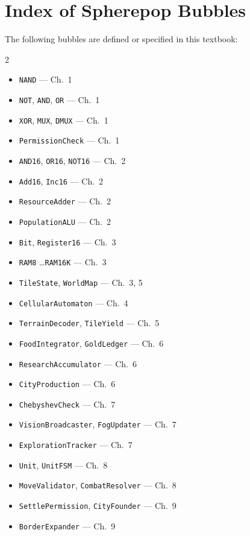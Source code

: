\documentclass[11pt,a4paper,openany]{book}
\theoremstyle{plain}
\theoremstyle{definition}
\theoremstyle{remark}
\begin{document}
\chapter*{Index of Spherepop Bubbles}

The following bubbles are defined or specified in this textbook:

\begin{multicols}{2}
\begin{itemize}[leftmargin=*, itemsep=0pt]
  \item \texttt{NAND} --- Ch.~1
  \item \texttt{NOT}, \texttt{AND}, \texttt{OR} --- Ch.~1
  \item \texttt{XOR}, \texttt{MUX}, \texttt{DMUX} --- Ch.~1
  \item \texttt{PermissionCheck} --- Ch.~1
  \item \texttt{AND16}, \texttt{OR16}, \texttt{NOT16} --- Ch.~2
  \item \texttt{Add16}, \texttt{Inc16} --- Ch.~2
  \item \texttt{ResourceAdder} --- Ch.~2
  \item \texttt{PopulationALU} --- Ch.~2
  \item \texttt{Bit}, \texttt{Register16} --- Ch.~3
  \item \texttt{RAM8} \ldots \texttt{RAM16K} --- Ch.~3
  \item \texttt{TileState}, \texttt{WorldMap} --- Ch.~3, 5
  \item \texttt{CellularAutomaton} --- Ch.~4
  \item \texttt{TerrainDecoder}, \texttt{TileYield} --- Ch.~5
  \item \texttt{FoodIntegrator}, \texttt{GoldLedger} --- Ch.~6
  \item \texttt{ResearchAccumulator} --- Ch.~6
  \item \texttt{CityProduction} --- Ch.~6
  \item \texttt{ChebyshevCheck} --- Ch.~7
  \item \texttt{VisionBroadcaster}, \texttt{FogUpdater} --- Ch.~7
  \item \texttt{ExplorationTracker} --- Ch.~7
  \item \texttt{Unit}, \texttt{UnitFSM} --- Ch.~8
  \item \texttt{MoveValidator}, \texttt{CombatResolver} --- Ch.~8
  \item \texttt{SettlePermission}, \texttt{CityFounder} --- Ch.~9
  \item \texttt{BorderExpander} --- Ch.~9

\end{itemize}
\end{multicols}
\end{document}
